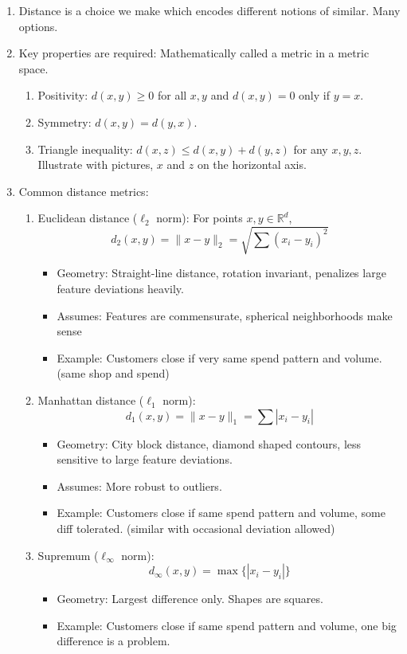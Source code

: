 \documentclass{article}
\begin{document}
\begin{enumerate}
\item Distance is a choice we make which encodes different notions of similar. Many options.
\item Key properties are required: Mathematically called a metric in a metric space.
\begin{enumerate}
\item Positivity: $d(x,y) \geq 0$ for all $x,y$ and $d(x,y) = 0$ only if $y=x$.
\item Symmetry: $d(x,y) = d(y,x)$.
\item Triangle inequality: $d(x,z) \leq d(x,y) + d(y,z)$ for any $x,y,z$. Illustrate with pictures, $x$ and $z$ on the horizontal axis.
\end{enumerate}
\item Common distance metrics:
\begin{enumerate}
\item Euclidean distance ($\ell_2$ norm): For points $x, y \in \mathbb{R}^d$,
\[
d_2(x,y) = \|x-y\|_2 = \sqrt{\sum (x_i-y_i)^2}
\]
\begin{itemize}
\item Geometry: Straight-line distance, rotation invariant, penalizes large feature deviations heavily.
\item Assumes: Features are commensurate, spherical neighborhoods make sense
\item Example: Customers close if very same spend pattern and volume. (same shop and spend)
\end{itemize}

\item Manhattan distance ($\ell_1$ norm):
\[
d_1(x,y) = \|x-y\|_1 = \sum |x_i - y_i|
\]
\begin{itemize}
\item Geometry: City block distance, diamond shaped contours, less sensitive to large feature deviations.
\item Assumes: More robust to outliers.
\item Example: Customers close if same spend pattern and volume, some diff tolerated. (similar with occasional deviation allowed)
\end{itemize}

\item Supremum ($\ell_{\infty}$ norm):
\[
d_{\infty}(x,y) = \max \{|x_i-y_i| \}
\]
\begin{itemize}
\item Geometry: Largest difference only. Shapes are squares.
\item Example: Customers close if same spend pattern and volume, one big difference is a problem. 
\end{itemize}


\end{enumerate}
\end{enumerate}
\end{document}
